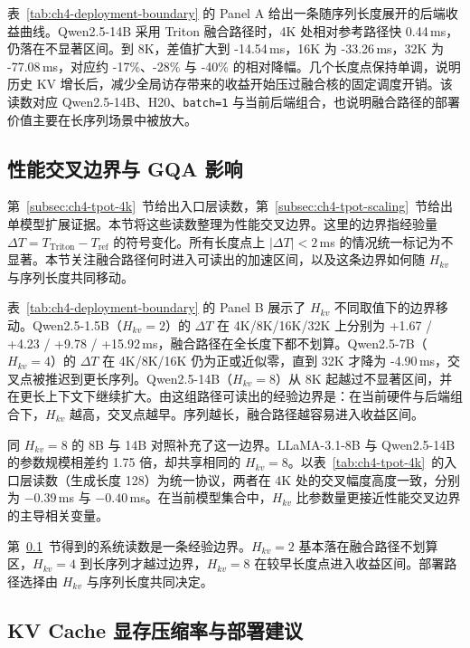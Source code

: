 表~\ref{tab:ch4-deployment-boundary} 的 Panel A 给出一条随序列长度展开的后端收益曲线。Qwen2.5-14B 采用 Triton 融合路径时，4K 处相对参考路径快 0.44\,ms，仍落在不显著区间。到 8K，差值扩大到 -14.54\,ms，16K 为 -33.26\,ms，32K 为 -77.08\,ms，对应约 -17\%、-28\% 与 -40\% 的相对降幅。几个长度点保持单调，说明历史 KV 增长后，减少全局访存带来的收益开始压过融合核的固定调度开销。该读数对应 Qwen2.5-14B、H20、\texttt{batch=1} 与当前后端组合，也说明融合路径的部署价值主要在长序列场景中被放大。


\subsection{性能交叉边界与 GQA 影响}
\label{subsec:ch4-crossover}

第~\ref{subsec:ch4-tpot-4k}~节给出入口层读数，第~\ref{subsec:ch4-tpot-scaling}~节给出单模型扩展证据。本节将这些读数整理为性能交叉边界。这里的边界指经验量 $\Delta T = T_{\mathrm{Triton}} - T_{\mathrm{ref}}$ 的符号变化。所有长度点上 $|\Delta T|<2$\,ms 的情况统一标记为不显著。本节关注融合路径何时进入可读出的加速区间，以及这条边界如何随 $H_{kv}$ 与序列长度共同移动。

表~\ref{tab:ch4-deployment-boundary} 的 Panel B 展示了 $H_{kv}$ 不同取值下的边界移动。Qwen2.5-1.5B（$H_{kv}=2$）的 $\Delta T$ 在 4K/8K/16K/32K 上分别为 +1.67 / +4.23 / +9.78 / +15.92\,ms，融合路径在全长度下都不划算。Qwen2.5-7B（$H_{kv}=4$）的 $\Delta T$ 在 4K/8K/16K 仍为正或近似零，直到 32K 才降为 -4.90\,ms，交叉点被推迟到更长序列。Qwen2.5-14B（$H_{kv}=8$）从 8K 起越过不显著区间，并在更长上下文下继续扩大。由这组路径可读出的经验边界是：在当前硬件与后端组合下，$H_{kv}$ 越高，交叉点越早。序列越长，融合路径越容易进入收益区间。

同 $H_{kv}=8$ 的 8B 与 14B 对照补充了这一边界。LLaMA-3.1-8B 与 Qwen2.5-14B 的参数规模相差约 1.75 倍，却共享相同的 $H_{kv}=8$。以表~\ref{tab:ch4-tpot-4k}~的入口层读数（生成长度 128）为统一协议，两者在 4K 处的交叉幅度高度一致，分别为 $-0.39$\,ms 与 $-0.40$\,ms。在当前模型集合中，$H_{kv}$ 比参数量更接近性能交叉边界的主导相关变量。

第~\ref{subsec:ch4-crossover}~节得到的系统读数是一条经验边界。$H_{kv}=2$ 基本落在融合路径不划算区，$H_{kv}=4$ 到长序列才越过边界，$H_{kv}=8$ 在较早长度点进入收益区间。部署路径选择由 $H_{kv}$ 与序列长度共同决定。

\subsection{KV Cache 显存压缩率与部署建议}
\label{subsec:ch4-kvcache}

